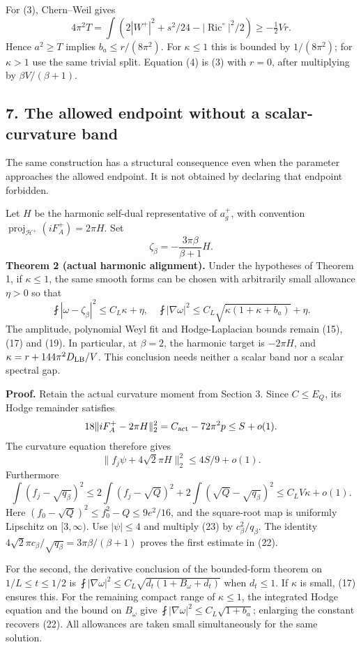 \documentclass[
  10pt,
]{article}
\begin{document}
For (3), Chern--Weil gives \[
4\pi^2T=\int\left(2|W^+|^2+s^2/24
-|\operatorname{Ric}^{\circ}|^2/2\right)
\ge-\tfrac12 Vr.
\] Hence \(a^2\ge T\) implies \(b_a\le r/(8\pi^2)\). For \(\kappa\le1\)
this is bounded by \(1/(8\pi^2)\); for \(\kappa>1\) use the same trivial
split. Equation (4) is (3) with \(r=0\), after multiplying by
\(\beta V/(\beta+1)\).

\hypertarget{the-allowed-endpoint-without-a-scalar-curvature-band}{%
\subsection{7. The allowed endpoint without a scalar-curvature
band}\label{the-allowed-endpoint-without-a-scalar-curvature-band}}

The same construction has a structural consequence even when the
parameter approaches the allowed endpoint. It is not obtained by
declaring that endpoint forbidden.

Let \(H\) be the harmonic self-dual representative of \(a_g^+\), with
convention \(\operatorname{proj}_{\mathcal H^+}(iF_A^+)=2\pi H\). Set \[
\zeta_\beta=-\frac{3\pi\beta}{\beta+1}H.
\] \textbf{Theorem 2 (actual harmonic alignment).} Under the hypotheses
of Theorem 1, if \(\kappa\le1\), the same smooth forms can be chosen
with arbitrarily small allowance \(\eta>0\) so that \[
\fint|\omega-\zeta_\beta|^2\le C_L\kappa+\eta,
\quad
\fint|\nabla\omega|^2
\le C_L\sqrt{\kappa(1+\kappa+b_a)}+\eta.
\tag{22}
\] The amplitude, polynomial Weyl fit and Hodge-Laplacian bounds remain
(15), (17) and (19). In particular, at \(\beta=2\), the harmonic target
is \(-2\pi H\), and \(\kappa=r+144\pi^2D_{\rm LB}/V\). This conclusion
needs neither a scalar band nor a scalar spectral gap.

\textbf{Proof.} Retain the actual curvature moment from Section 3. Since
\(C\le E_Q\), its Hodge remainder satisfies \[
18\|iF_A^+-2\pi H\|_2^2
=C_{\rm act}-72\pi^2p\le S+o(1).
\] The curvature equation therefore gives \[
\|f_j\psi+4\sqrt2\pi H\|_2^2\le4S/9+o(1).
\tag{23}
\] Furthermore \[
\int(f_j-\sqrt{q_\beta})^2
\le2\int(f_j-\sqrt Q)^2
+2\int(\sqrt Q-\sqrt{q_\beta})^2
\le C_LV\kappa+o(1).
\] Here \((f_0-\sqrt Q)^2\le f_0^2-Q\le9e^2/16\), and the square-root
map is uniformly Lipschitz on \([3,\infty)\). Use \(|\psi|\le4\) and
multiply (23) by \(c_\beta^2/q_\beta\). The identity
\(4\sqrt2\pi c_\beta/\sqrt{q_\beta} =3\pi\beta/(\beta+1)\) proves the
first estimate in (22).

For the second, the derivative conclusion of the bounded-form theorem on
\(1/L\le t\le1/2\) is
\(\fint|\nabla\omega|^2\le C_L\sqrt{d_t(1+B_\omega+d_t)}\) when
\(d_t\le1\). If \(\kappa\) is small, (17) ensures this. For the
remaining compact range of \(\kappa\le1\), the integrated Hodge equation
and the bound on \(B_\omega\) give
\(\fint|\nabla\omega|^2\le C_L\sqrt{1+b_a}\); enlarging the constant
recovers (22). All allowances are taken small simultaneously for the
same solution.
\end{document}
